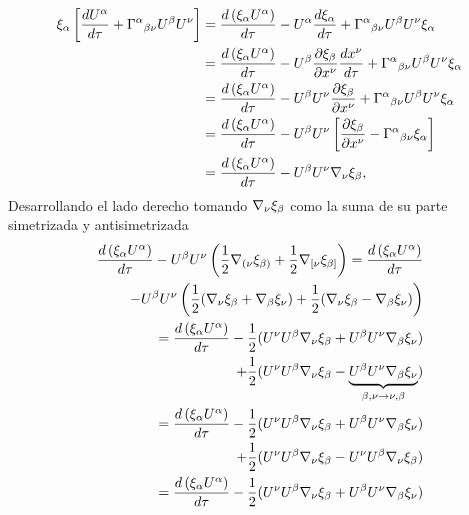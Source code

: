 \begin{equation}
\begin{aligned}
    \xi_\alpha\left[\frac{d U^\alpha}{d \tau}+\Gamma^\alpha{ }_{\beta \nu} U^\beta U^\nu\right] & = \frac{d \left(\xi_\alpha U^\alpha\right)}{d  \tau}-U^\alpha \frac{d \xi_\alpha}{d \tau}+\Gamma^\alpha{ }_{\beta \nu} U^\beta U^\nu \xi_\alpha \\
    & = \frac{d \left(\xi_\alpha U^\alpha\right)}{d  \tau} - U^\beta \frac{\partial \xi_\beta}{\partial x^\nu} \frac{d x^\nu}{d \tau} + \Gamma^\alpha{ }_{\beta \nu} U^\beta U^\nu \xi_\alpha \\
    & = \frac{d \left(\xi_\alpha U^\alpha\right)}{d  \tau} - U^\beta U^\nu \frac{\partial \xi_\beta}{\partial x^\nu} + \Gamma^\alpha{ }_{\beta \nu} U^\beta U^\nu \xi_\alpha\\
    & = \frac{d \left(\xi_\alpha U^\alpha\right)}{d  \tau} - U^\beta U^\nu \left[ \frac{\partial \xi_\beta}{\partial x^\nu} - \Gamma^\alpha{ }_{\beta \nu}  \xi_\alpha \right]\\ 
    & = \frac{d \left(\xi_\alpha U^\alpha\right)}{d  \tau} - U^\beta U^\nu \mathbf{\nabla}_\nu \xi_\beta ,\\
\end{aligned}    
\end{equation}
Desarrollando el lado derecho tomando   
 $\mathbf{\nabla}_\nu \xi_\beta $ como la suma de su parte simetrizada y antisimetrizada
\begin{equation}
        \begin{aligned}
            \frac{d \left(\xi_\alpha U^\alpha\right)}{d  \tau} - U^\beta U^\nu \left(\frac{1}{2}\mathbf{\nabla}_{(\nu }\xi_{\beta)} + \frac{1}{2}\mathbf{\nabla}_{[\nu }\xi_{\beta]}\right)  = \frac{d \left(\xi_\alpha U^\alpha\right)}{d  \tau} 
            \\ -U^\beta U^\nu \left(\frac{1}{2}(\mathbf{\nabla}_{\nu }\xi_{\beta} + \mathbf{\nabla}_{\beta }\xi_{\nu}) + \frac{1}{2}(\mathbf{\nabla}_{\nu }\xi_{\beta} - \mathbf{\nabla}_{\beta }\xi_{\nu})\right) \\
            =\frac{d \left(\xi_\alpha U^\alpha\right)}{d  \tau} - \frac{1}{2}(U^\nu U^\beta  \mathbf{\nabla}_{\nu }\xi_{\beta} + U^\beta U^\nu\mathbf{\nabla}_{\beta }\xi_{\nu})\\
             + \frac{1}{2}( U^\nu U^\beta \mathbf{\nabla}_{\nu }\xi_{\beta} - \underbrace{U^\beta U^\nu\mathbf{\nabla}_{\beta }\xi_{\nu}}_{\beta,\nu \rightarrow \nu,\beta})\\
            =\frac{d \left(\xi_\alpha U^\alpha\right)}{d  \tau} - \frac{1}{2}(U^\nu U^\beta  \mathbf{\nabla}_{\nu }\xi_{\beta} + U^\beta U^\nu\mathbf{\nabla}_{\beta }\xi_{\nu}) \\
            + \frac{1}{2}( U^\nu U^\beta \mathbf{\nabla}_{\nu }\xi_{\beta} -  U^\nu U^\beta \mathbf{\nabla}_{\nu }\xi_{\beta})\\
            =\frac{d \left(\xi_\alpha U^\alpha\right)}{d  \tau} - \frac{1}{2}(U^\nu U^\beta  \mathbf{\nabla}_{\nu }\xi_{\beta} + U^\beta U^\nu\mathbf{\nabla}_{\beta }\xi_{\nu})     
        \end{aligned}
\end{equation}
